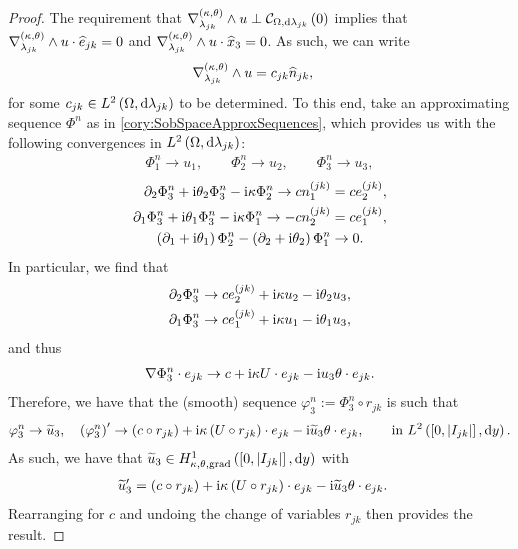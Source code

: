 \begin{proof}
	The requirement that $\nabla_{\lambda_{jk}}^{\left( \kappa, \theta \right)}\wedge u \perp \mathcal{C}_{ \Omega, \mathrm{d}\lambda_{jk}}\left( 0 \right)$ implies that $\nabla_{\lambda_{jk}}^{\left( \kappa, \theta \right)}\wedge u\cdot \widehat{e}_{jk} = 0$ and $\nabla_{\lambda_{jk}}^{\left( \kappa, \theta \right)}\wedge u\cdot \widehat{x}_3 = 0$.
	As such, we can write
	\begin{align*}
		\nabla_{\lambda_{jk}}^{\left( \kappa, \theta \right)}\wedge u &= c_{jk}\widehat{n}_{jk},
	\end{align*}
	for some $c_{jk}\in L^{2}\left( \Omega,\mathrm{d}\lambda_{jk} \right)$ to be determined.
	To this end, take an approximating sequence $\Phi^n$ as in \ref{cory:SobSpaceApproxSequences}, which provides us with the following convergences in $L^{2}\left( \Omega,\mathrm{d}\lambda_{jk} \right)$:
	\begin{align*}
		\Phi^n_1 \rightarrow u_1, \qquad \Phi^n_2 \rightarrow u_2, \qquad \Phi^n_3 \rightarrow u_3,
	\end{align*}
	\begin{align*}
		\partial_2\Phi^n_3 + \mathrm{i}\theta_2\Phi^n_3 - \mathrm{i}\kappa\Phi^n_2 \rightarrow c n_1^{(jk)} &= c e_2^{(jk)}, \\
		\partial_1\Phi^n_3 + \mathrm{i}\theta_1\Phi^n_3 - \mathrm{i}\kappa\Phi^n_1 \rightarrow -c n_2^{(jk)} &= c e_1^{(jk)}, \\
		\left( \partial_1 + \mathrm{i}\theta_1 \right)\Phi^n_2 - \left( \partial_2 + \mathrm{i}\theta_2 \right)\Phi^n_1 &\rightarrow 0.
	\end{align*}
	In particular, we find that
	\begin{align*}
		\partial_2\Phi^n_3 &\rightarrow ce_2^{(jk)} + \mathrm{i}\kappa u_2 - \mathrm{i}\theta_2 u_3, \\
		\partial_1\Phi^n_3 &\rightarrow ce_1^{(jk)} + \mathrm{i}\kappa u_1 - \mathrm{i}\theta_1 u_3,
	\end{align*}
	and thus
	\begin{align*}
		\nabla\Phi^n_3\cdot e_{jk} \rightarrow c + \mathrm{i}\kappa U\cdot e_{jk} - \mathrm{i} u_3 \theta\cdot e_{jk}.
	\end{align*}
	Therefore, we have that the (smooth) sequence $\varphi^n_3 := \Phi^n_3 \circ r_{jk}$ is such that
	\begin{align*}
		\varphi^n_3 \rightarrow \widetilde{u}_3, \quad \left( \varphi^n_3 \right)' \rightarrow \left( c\circ r_{jk} \right) + \mathrm{i}\kappa \left( U\circ r_{jk} \right)\cdot e_{jk} - \mathrm{i} \widetilde{u}_3\theta\cdot e_{jk}, \qquad\text{in } L^{2}\left( \left[ 0,\left\lvert I_{jk} \right\rvert \right],\mathrm{d}y \right).
	\end{align*}
	As such, we have that $\widetilde{u}_3\in H^1_{\kappa,\theta,\mathrm{grad}}\left( \left[ 0,\left\lvert I_{jk} \right\rvert \right], \mathrm{d}y \right)$ with 
	\begin{align*}
		\widetilde{u}_3' &= \left( c\circ r_{jk} \right) + \mathrm{i}\kappa \left( U\circ r_{jk} \right)\cdot e_{jk} - \mathrm{i} \widetilde{u}_3\theta\cdot e_{jk}.
	\end{align*}
	Rearranging for $c$ and undoing the change of variables $r_{jk}$ then provides the result.
\end{proof}

